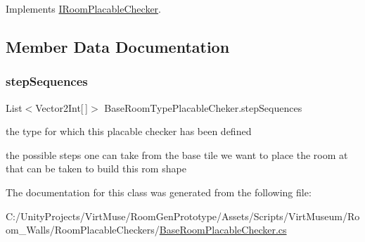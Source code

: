Implements \mbox{\hyperlink{interface_i_room_placable_checker_ab4a1591854373fc3b48619dbeb1e2755}{I\+Room\+Placable\+Checker}}.



\subsection{Member Data Documentation}
\mbox{\label{class_base_room_type_placable_cheker_aa1c2ec3105266167905e9be9af7a82be}} 
\subsubsection{\texorpdfstring{step\+Sequences}{stepSequences}}
{\footnotesize\ttfamily List$<$Vector2\+Int\mbox{[}$\,$\mbox{]}$>$ Base\+Room\+Type\+Placable\+Cheker.\+step\+Sequences\hspace{0.3cm}{\ttfamily [private]}}



the type for which this placable checker has been defined 

the possible steps one can take from the base tile we want to place the room at that can be taken to build this rom shape 

The documentation for this class was generated from the following file\+:\begin{DoxyCompactItemize}
\item 
C\+:/\+Unity\+Projects/\+Virt\+Muse/\+Room\+Gen\+Prototype/\+Assets/\+Scripts/\+Virt\+Museum/\+Room\+\_\+\+Walls/\+Room\+Placable\+Checkers/\mbox{\hyperlink{_base_room_placable_checker_8cs}{Base\+Room\+Placable\+Checker.\+cs}}\end{DoxyCompactItemize}
